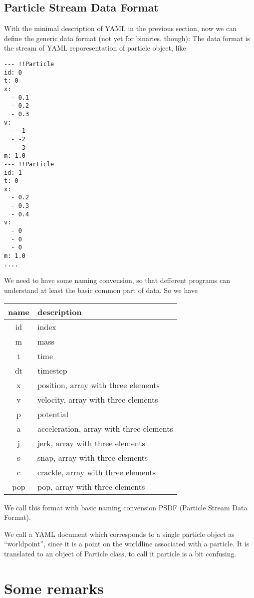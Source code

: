 \documentclass[12pt]{article}
\begin{document}
\subsection{Particle Stream Data Format}
With the  minimal description of YAML in the previous section, now
we can define the generic data format (not yet for binaries, though):
The data format is the stream of YAML reporesentation of particle
object, like

\begin{verbatim}
--- !!Particle
id: 0
t: 0
x:
  - 0.1
  - 0.2
  - 0.3
v:
  - -1
  - -2
  - -3
m: 1.0
--- !!Particle
id: 1
t: 0
x:
  - 0.2
  - 0.3
  - 0.4
v:
  - 0
  - 0
  - 0
m: 1.0
....
\end{verbatim}
We need to have some naming convension, so that defferent programs can
understand at least the basic common part of data. So we have

\begin{center}
\begin{tabular}{|c|l|}
\hline
name & description\\
\hline
id & index\\
m & mass\\
t & time\\
dt & timestep\\
x  & position, array with three elements\\
v  & velocity, array with three elements\\
p  & potential\\
a  & acceleration, array with three elements\\
j  & jerk, array with three elements\\
s  & snap, array with three elements\\
c  & crackle, array with three elements\\
pop  & pop, array with three elements\\
\hline
\end{tabular}
\end{center}

We call this format with basic naming convension PSDF (Particle Stream
Data Format).

We call a YAML document which corresponds to a single particle object
as ``worldpoint'', since it is a point on the worldline associated
with a particle. It is translated to an object of Particle class, to
call it particle is a bit confusing.


\section{Some remarks}
\end{document}
